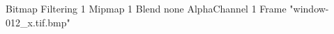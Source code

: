 {Bitmap
	{Filtering 1}
	{Mipmap 1}
	{Blend none}
	{AlphaChannel 1}
	{Frame "window-012_x.tif.bmp"}
}
